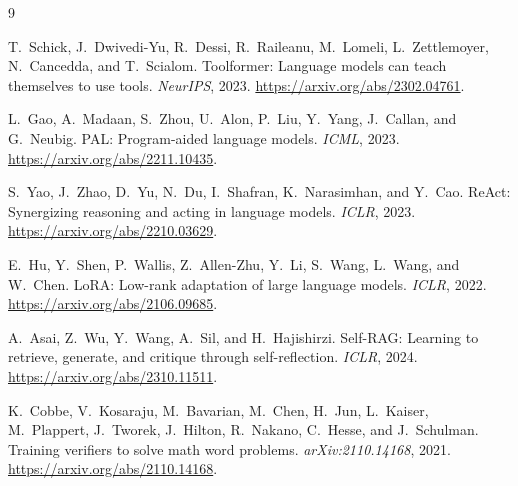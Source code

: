 \documentclass[11pt]{article}
\begin{document}
\begin{thebibliography}{9}

T.~Schick, J.~Dwivedi-Yu, R.~Dessi, R.~Raileanu, M.~Lomeli, L.~Zettlemoyer,
N.~Cancedda, and T.~Scialom.
Toolformer: Language models can teach themselves to use tools.
\emph{NeurIPS}, 2023.
\url{https://arxiv.org/abs/2302.04761}.

L.~Gao, A.~Madaan, S.~Zhou, U.~Alon, P.~Liu, Y.~Yang, J.~Callan, and G.~Neubig.
PAL: Program-aided language models.
\emph{ICML}, 2023.
\url{https://arxiv.org/abs/2211.10435}.

S.~Yao, J.~Zhao, D.~Yu, N.~Du, I.~Shafran, K.~Narasimhan, and Y.~Cao.
ReAct: Synergizing reasoning and acting in language models.
\emph{ICLR}, 2023.
\url{https://arxiv.org/abs/2210.03629}.

E.~Hu, Y.~Shen, P.~Wallis, Z.~Allen-Zhu, Y.~Li, S.~Wang, L.~Wang, and W.~Chen.
LoRA: Low-rank adaptation of large language models.
\emph{ICLR}, 2022.
\url{https://arxiv.org/abs/2106.09685}.

A.~Asai, Z.~Wu, Y.~Wang, A.~Sil, and H.~Hajishirzi.
Self-RAG: Learning to retrieve, generate, and critique through self-reflection.
\emph{ICLR}, 2024.
\url{https://arxiv.org/abs/2310.11511}.

K.~Cobbe, V.~Kosaraju, M.~Bavarian, M.~Chen, H.~Jun, L.~Kaiser,
M.~Plappert, J.~Tworek, J.~Hilton, R.~Nakano, C.~Hesse, and J.~Schulman.
Training verifiers to solve math word problems.
\emph{arXiv:2110.14168}, 2021.
\url{https://arxiv.org/abs/2110.14168}.

\end{thebibliography}
\end{document}
